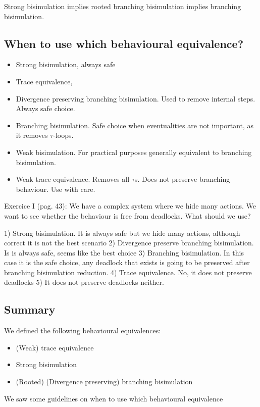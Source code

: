 Strong bisimulation implies rooted branching bisimulation implies branching bisimulation.

\subsection{When to use which behavioural equivalence?}

\begin{itemize}
  \item Strong bisimulation, always safe
  \item Trace equivalence, 
  \item Divergence preserving branching bisimulation. Used to remove internal steps. Always safe choice.
  \item Branching bisimulation. Safe choice when eventualities are not important, as it removes
  \(\tau\)-loops.
  \item Weak bisimulation. For practical purposes generally equivalent to branching bisimulation.
  \item Weak trace equivalence. Removes all \(\tau\)s. Does not preserve branching behaviour.
  Use with care.
\end{itemize}

Exercice I (pag. 43): We have a complex system where we hide many actions. We want to see whether
the behaviour is free from deadlocks. What should we use?

1) Strong bisimulation. It is always safe but we hide many actions, although correct it is not 
the best scenario
2) Divergence preserve branching bisimulation. Is is always safe, seems like the best choice
3) Branching bisimulation. In this case it is the safe choice, any deadlock that exists is going
to be preserved after branching bisimulation reduction.
4) Trace equivalence. No, it does not preserve deadlocks
5) It does not preserve deadlocks neither.

\subsection{Summary}

We defined the following behavioural equivalences:
\begin{itemize}
  \item (Weak) trace equivalence
  \item Strong bisimulation
  \item (Rooted) (Divergence preserving) branching bisimulation
\end{itemize}

We saw some guidelines on when to use which behavioural equivalence



